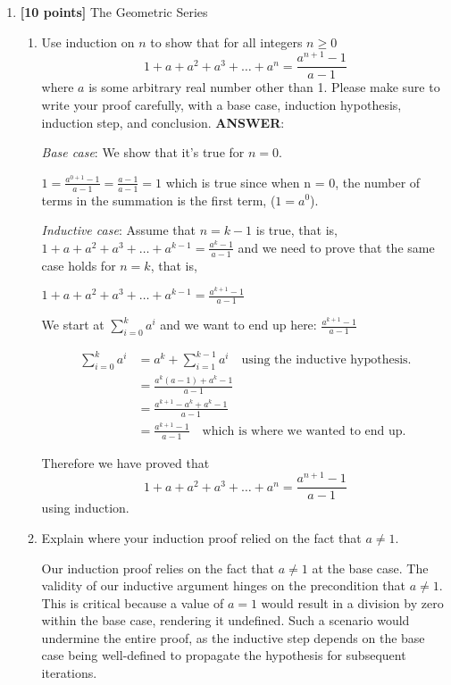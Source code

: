 \documentclass[11pt]{article}
\begin{document}
\begin{enumerate}

\item \textbf{[10 points]} The Geometric Series
 \begin{enumerate}
 \item Use induction on $n$ to show that for all integers $n \geq 0$
 \[
   1 + a + a^{2} + a^{3} + \ldots + a^{n} = \frac{a^{n+1} - 1}{a - 1}
 \]
where $a$ is some arbitrary real number other than 1. Please make sure to write your proof carefully, with a base case, induction hypothesis, induction
step, and conclusion.
\textbf{ANSWER}:

\emph{Base case}: We show that it's true for $n=0$.

$1 = \frac{a^{0+1} - 1}{a - 1} = \frac{a - 1}{a - 1} = 1$ which is true since when n = 0, the number of terms in the summation is the first term, ($1 = a^0$).

\emph{Inductive case}: Assume that $n = k - 1$ is true, that is, $1 + a + a^{2} + a^{3} + \ldots + a^{k-1} = \frac{a^k - 1}{a - 1}$ and we need to prove that the same case holds for $n=k$, that is,

$1 + a + a^{2} + a^{3} + \ldots + a^{k-1} = \frac{a^{k+1} - 1}{a - 1}$

We start at $\sum_{i=0}^k a^i$ and we want to end up here: $\frac{a^{k+1}-1}{a-1}$

\begin{align*}
    \sum_{i=0}^k a^i &= a^k+\sum_{i=1}^{k-1}a^i \quad \text{using the inductive hypothesis.} \\
    &= \frac{a^k(a-1)+a^k-1}{a-1} \\
    &= \frac{a^{k+1}-a^k+a^k-1}{a-1} \\
    &= \frac{a^{k+1}-1}{a-1} \quad \text{which is where we wanted to end up.}
\end{align*}

Therefore we have proved that \[
   1 + a + a^{2} + a^{3} + \ldots + a^{n} = \frac{a^{n+1} - 1}{a - 1}
 \] using induction.
 

\item Explain where your induction proof relied on the fact that $a \neq 1$.

Our induction proof relies on the fact that $a \neq 1$ at the base case.
The validity of our inductive argument hinges on the precondition that $a \neq 1$. This is critical because a value of $a = 1$ would result in a division by zero within the base case, rendering it undefined. Such a scenario would undermine the entire proof, as the inductive step depends on the base case being well-defined to propagate the hypothesis for subsequent iterations.


\end{enumerate}
\end{enumerate}
\end{document}
